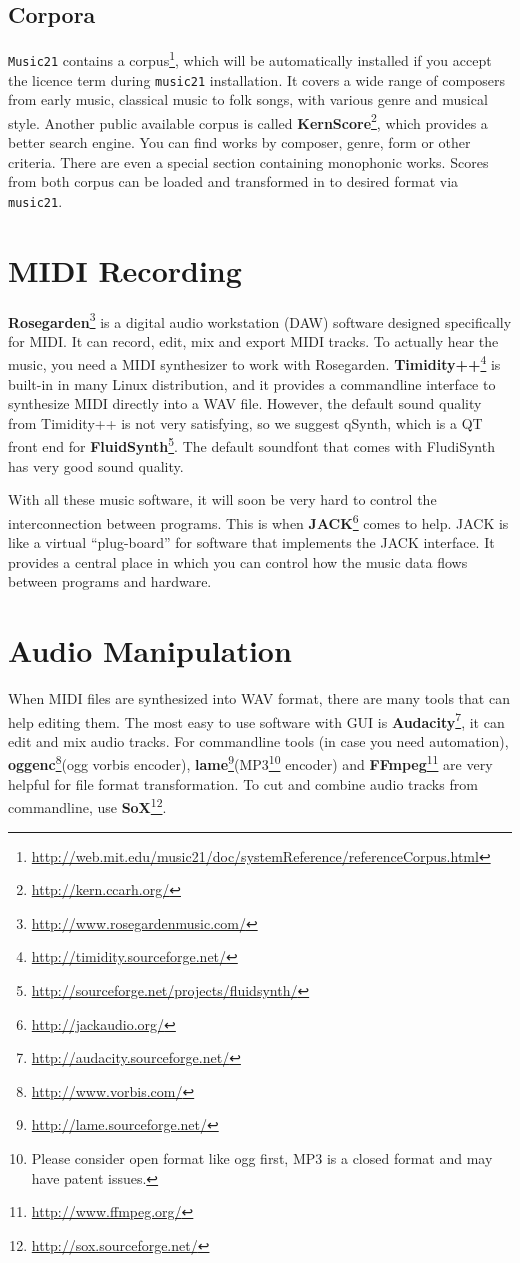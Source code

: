 \subsection*{Corpora}
\texttt{Music21} contains a corpus\footnote{\url{http://web.mit.edu/music21/doc/systemReference/referenceCorpus.html}}, which will be automatically installed if you accept the licence term during \texttt{music21} installation. It covers a wide range of composers from early music, classical music to folk songs, with various genre and musical style. Another public available corpus is called \textbf{KernScore}\footnote{\url{http://kern.ccarh.org/}}, which provides a better search engine. You can find works by composer, genre, form or other criteria. There are even a special section containing monophonic works. Scores from both corpus can be loaded and transformed in to desired format via \texttt{music21}.

\section*{MIDI Recording}
\textbf{Rosegarden}\footnote{\url{http://www.rosegardenmusic.com/}} is a digital audio workstation (DAW) software designed specifically for MIDI. It can record, edit, mix and export MIDI tracks. To actually hear the music, you need a MIDI synthesizer to work with Rosegarden. \textbf{Timidity++}\footnote{\url{http://timidity.sourceforge.net/}} is built-in in many Linux distribution, and it provides a commandline interface to synthesize MIDI directly into a WAV file. However, the default sound quality from Timidity++ is not very satisfying, so we suggest qSynth, which is a QT front end for \textbf{FluidSynth}\footnote{\url{http://sourceforge.net/projects/fluidsynth/}}. The default soundfont that comes with FludiSynth has very good sound quality.

With all these music software, it will soon be very hard to control the interconnection between programs. This is when \textbf{JACK}\footnote{\url{http://jackaudio.org/}} comes to help. JACK is like a virtual \enquote{plug-board} for software that implements the JACK interface. It provides a central place in which you can control how the music data flows between programs and hardware.

\section*{Audio Manipulation}

When MIDI files are synthesized into WAV format, there are many tools that can help editing them. The most easy to use software with GUI is \textbf{Audacity}\footnote{\url{http://audacity.sourceforge.net/}}, it can edit and mix audio tracks. For commandline tools (in case you need automation), \textbf{oggenc}\footnote{\url{http://www.vorbis.com/}}(ogg vorbis encoder), \textbf{lame}\footnote{\url{http://lame.sourceforge.net/}}(MP3\footnote{Please consider open format like ogg first, MP3 is a closed format and may have patent issues.} encoder) and \textbf{FFmpeg}\footnote{\url{http://www.ffmpeg.org/}} are very helpful for file format transformation. To cut and combine audio tracks from commandline, use \textbf{SoX}\footnote{\url{http://sox.sourceforge.net/}}.

